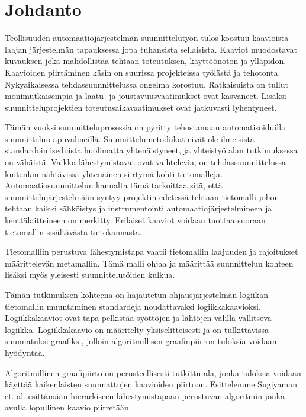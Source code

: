 \documentclass[finnish,12pt]{article}
\begin{document}
	\cleardoublepage
	\storeinipagenumber
	\setcounter{page}{1}

	\section{Johdanto}
	\thispagestyle{empty}

Teollisuuden automaatiojärjestelmän suunnittelutyön tulos koostuu kaavioista -
laajan järjestelmän tapauksessa jopa tuhansista sellaisista. Kaaviot muodostavat
kuvauksen joka mahdollistaa tehtaan toteutuksen, käyttöönoton ja ylläpidon.
Kaavioiden piirtäminen käsin on suurissa projekteissa työlästä ja tehotonta.
Nykyaikaisessa tehdassuunnittelussa ongelma korostuu. Ratkaisuista on tullut
monimutkaisempia ja laatu- ja joustavuusvaatimukset ovat kasvaneet. Lisäksi
suunnitteluprojektien toteutusaikavaatimukset ovat jatkuvasti lyhentyneet.
\cite{RefWorks:41}

Tämän vuoksi suunnitteluprosessia on pyritty tehostamaan automatisoiduilla
suunnittelun apuvälineillä. Suunnittelumetodiikat eivät ole
ilmeisistä standardoimiseduista huolimatta yhtenäistyneet, ja yhteistyö alan
tutkimuksessa on vähäistä. Vaikka lähestymistavat ovat vaihtelevia, on
tehdassuunnittelussa kuitenkin nähtävissä yhtenäinen siirtymä kohti 
tietomalleja. Automaatiosuunnittelun kannalta tämä tarkoittaa sitä, että
suunnittelujärjestelmään syntyy projektin edetessä tehtaan
tietomalli johon tehtaan kaikki sähköistys ja instrumentointi
automaatiojärjestelmineen ja kenttälaitteineen on merkitty. Erilaiset kaaviot
voidaan tuottaa suoraan tietomallin sisältävästä tietokannasta.

Tietomalliin perustuva lähestymistapa vaatii tietomallin laajuuden ja rajoitukset
määrittelevän metamallin. Tämä malli ohjaa ja määrittää suunnittelun kohteen lisäksi
myös yleisesti suunnittelutöiden kulkua.

Tämän tutkimuksen kohteena on hajautetun ohjausjärjestelmän logiikan
tietomallin muuntaminen standardeja noudattavaksi logiikkakaavioksi.
Logiikkakaaviot ovat tapa pelkistää syöttöjen ja lähtöjen välillä vallitseva
logiikka. Logiikkakaavio on määritelty yksiselitteisesti ja on tulkittavissa
suunnatuksi graafiksi, jolloin algoritmillisen graafinpiirron tuloksia voidaan
hyödyntää.

Algoritmillinen graafipiirto on perusteellisesti tutkittu ala, jonka tuloksia
voidaan käyttää kaikenlaisten suunnattujen kaavioiden piirtoon. Esittelemme
Sugiyaman et. al. \cite{RefWorks:9} esittämään hierarkiseen lähestymistapaan
perustuvan algoritmin jonka avulla lopullinen kaavio piirretään.
\end{document}
